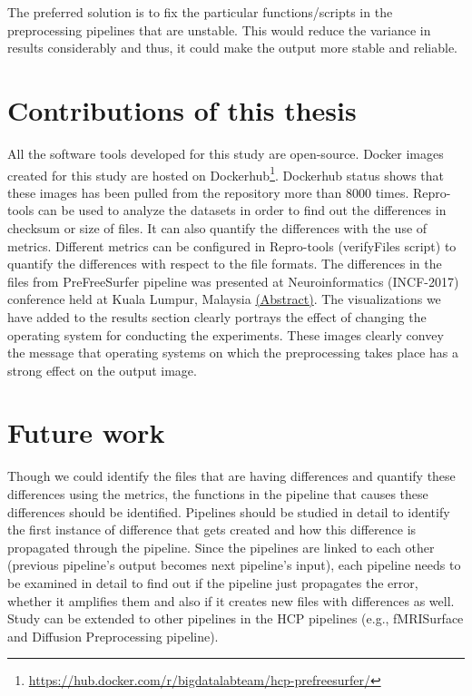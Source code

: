 The preferred solution is to fix the particular functions/scripts in the preprocessing pipelines that are unstable. This would reduce the variance in results considerably and thus, it could make the output more stable and reliable.

\section{Contributions of this thesis}
All the software tools developed for this study are open-source.
 Docker images created for this study are hosted on 
 Dockerhub\footnote{\url{https://hub.docker.com/r/bigdatalabteam/hcp-prefreesurfer/}}. 
 Dockerhub status shows that these images has been pulled from the 
 repository more than 8000 times. Repro-tools can be used to analyze 
 the datasets in order to find out the differences in checksum or size 
 of files. It can also quantify the differences with the use of 
 metrics. Different metrics can be configured in Repro-tools 
 (verifyFiles script) to quantify the differences with respect to the 
 file formats. The differences in the files from PreFreeSurfer pipeline was presented at Neuroinformatics (INCF-2017) conference held at Kuala Lumpur, Malaysia \href{https://abstracts.g-node.org/abstracts/1d0afd7e-0542-4b79-99df-e15c5e0e4487}{(Abstract)}. The visualizations we have added to the results section 
 clearly portrays the effect of changing the operating system for 
 conducting the experiments. These images clearly convey the message 
 that operating systems on which the preprocessing takes place has a 
 strong effect on the output image.

\section{Future work}
Though we could identify the files that are having differences and quantify these differences using the metrics, the functions in the pipeline that causes these differences should be identified.
Pipelines should be studied in detail to identify the first instance of difference that gets created and how this difference is propagated through the pipeline.
Since the pipelines are linked to each other (previous pipeline's output becomes next pipeline's input), each pipeline needs to be examined in detail to find out if the pipeline just propagates the error, whether it amplifies them and also if it creates new files with differences as well. 
Study can be extended to other pipelines in the HCP pipelines (e.g., fMRISurface and Diffusion Preprocessing pipeline).
